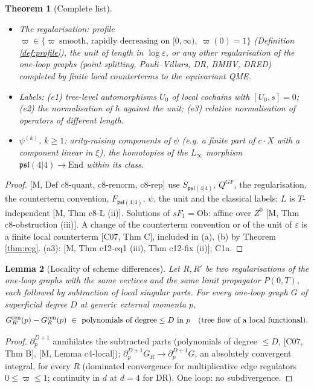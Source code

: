 \documentclass[10pt]{article}
\newtheorem{theorem}{Theorem}[section]
\newtheorem{lemma}[theorem]{Lemma}
\theoremstyle{definition}
\newcommand{\pl}{\mathfrak{psl}(4|4)}
\newcommand{\Ob}{\mathrm{Ob}}
\newcommand{\End}{\mathrm{End}}
\begin{document}
\begin{theorem}[Complete list]
\begin{itemize}
\item[(d)] The regularisation: profile $\varpi\in\{\varpi\ \text{smooth, rapidly decreasing on }[0,\infty),\ \varpi(0)=1\}$ (Definition \ref{def:profile}), the unit of length in $\log\varepsilon$, or any other regularisation of the one-loop graphs (point splitting, Pauli--Villars, DR, BMHV, DRED) completed by finite local counterterms to the equivariant QME.
\item[(e)] Labels: (e1) tree-level automorphisms $U_0$ of local cochains with $[U_0,s]=0$; (e2) the normalisation of $\hbar$ against the unit; (e3) relative normalisation of operators of different length.
\item[(f)] $\psi^{(k)}$, $k\ge1$: arity-raising components of $\psi$ (e.g. a finite part of $c\cdot X$ with a component linear in $\xi$), the homotopies of the $L_\infty$ morphism $\pl\to\End$ within its class.
\end{itemize}
\end{theorem}
\begin{proof}{}[M, Def c8-quant, c8-renorm, c8-rep] use $S_{\pl}$, $Q^{GF}$, the regularisation, the counterterm convention, $F_{\pl}$, $\psi$, the unit and the classical labels; $L$ is $T$-independent [M, Thm c8-L (ii)]. Solutions of $sF_1=\Ob$: affine over $Z^0$ [M, Thm c8-obstruction (iii)]. A change of the counterterm convention or of the unit of $\varepsilon$ is a finite local counterterm [C07, Thm C], included in (a), (b) by Theorem \ref{thm:reg}. (a3): [M, Thm c12-eq1 (iii), Thm c12-fix (ii)]; C1a.
\end{proof}

\begin{lemma}[Locality of scheme differences]\label{lem:loc}
Let $R,R'$ be two regularisations of the one-loop graphs with the same vertices and the same limit propagator $P(0,T)$, each followed by subtraction of local singular parts. For every one-loop graph $G$ of superficial degree $D$ at generic external momenta $p$,
\[
G^{\rm ren}_{R'}(p)-G^{\rm ren}_R(p)\ \in\ \text{polynomials of degree}\le D\ \text{in }p\quad(\text{tree flow of a local functional}).
\]
\end{lemma}
\begin{proof}
$\partial_p^{D+1}$ annihilates the subtracted parts (polynomials of degree $\le D$, [C07, Thm B], [M, Lemma c4-local]); $\partial_p^{D+1}G_R\to\partial_p^{D+1}G$, an absolutely convergent integral, for every $R$ (dominated convergence for multiplicative edge regulators $0\le\varpi\le1$; continuity in $d$ at $d=4$ for DR). One loop: no subdivergence.
\end{proof}
\end{document}
